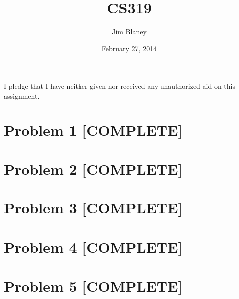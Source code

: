 \documentclass[6pt]{article}
\title{CS319}
\author{Jim Blaney}
\date{February 27, 2014}
\begin{document}
\setlength{\abovecaptionskip}{0pt}
\setlength{\belowcaptionskip}{5pt}

\noindent I pledge that I have neither given nor received any unauthorized aid on this assignment. \\[4em]

\section*{Problem 1 [COMPLETE]}







\section*{Problem 2 [COMPLETE]}





\section*{Problem 3 [COMPLETE]}







\section*{Problem 4 [COMPLETE]}



\section*{Problem 5 [COMPLETE]}


\end{document}
